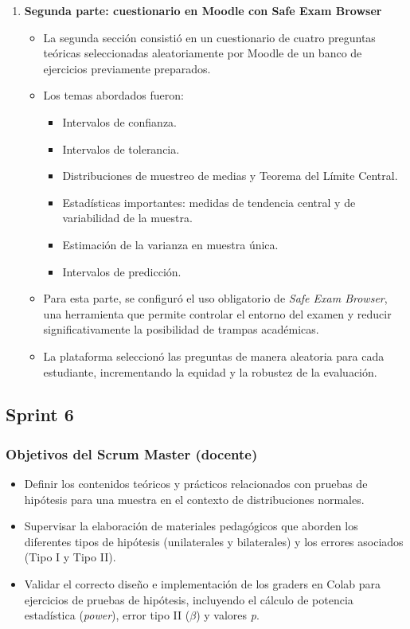 \documentclass[letter,oneside,12pt,spanish]{report}
\begin{document}
\begin{enumerate}
	\item \textbf{Segunda parte: cuestionario en Moodle con Safe Exam Browser}  
	\begin{itemize}
		\item La segunda sección consistió en un cuestionario de cuatro preguntas teóricas seleccionadas aleatoriamente por Moodle de un banco de ejercicios previamente preparados.
		\item Los temas abordados fueron:
		\begin{itemize}
			\item Intervalos de confianza.
			\item Intervalos de tolerancia.
			\item Distribuciones de muestreo de medias y Teorema del Límite Central.
			\item Estadísticas importantes: medidas de tendencia central y de variabilidad de la muestra.
			\item Estimación de la varianza en muestra única.
			\item Intervalos de predicción.
		\end{itemize}
		\item Para esta parte, se configuró el uso obligatorio de \textit{Safe Exam Browser}, una herramienta que permite controlar el entorno del examen y reducir significativamente la posibilidad de trampas académicas.
		\item La plataforma seleccionó las preguntas de manera aleatoria para cada estudiante, incrementando la equidad y la robustez de la evaluación.
	\end{itemize}
\end{enumerate}

\subsection{Sprint 6}

\subsubsection*{Objetivos del Scrum Master (docente)}
\begin{itemize}
	\item Definir los contenidos teóricos y prácticos relacionados con pruebas de hipótesis para una muestra en el contexto de distribuciones normales.
	\item Supervisar la elaboración de materiales pedagógicos que aborden los diferentes tipos de hipótesis (unilaterales y bilaterales) y los errores asociados (Tipo I y Tipo II).
	\item Validar el correcto diseño e implementación de los graders en Colab para ejercicios de pruebas de hipótesis, incluyendo el cálculo de potencia estadística (\textit{power}), error tipo II (\(\beta\)) y valores \textit{p}.
\end{itemize}
\end{document}
